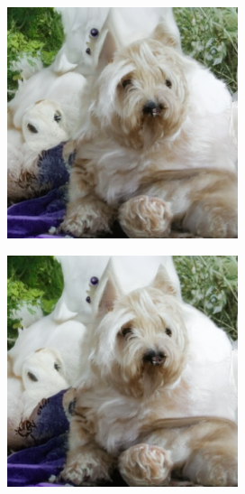 \documentclass{article}
\begin{document}
\begin{figure}
\begin{subfigure}[b]{0.19\linewidth}
    \end{subfigure}
    \begin{subfigure}[b]{0.19\linewidth}
    \includegraphics[width=\linewidth]{figures/imagenet256/solver_samples/imagenet256_fm_ot_08_20.png}
    \end{subfigure}
    \begin{subfigure}[b]{0.19\linewidth}
    \includegraphics[width=\linewidth]{figures/imagenet256/solver_samples/imagenet256_fm_ot_08_30.png}

\end{subfigure}
\end{figure}
\end{document}
